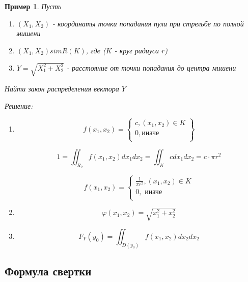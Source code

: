 \documentclass[a4paper, 14pt]{report}
\newtheorem{example}{Пример}[section]
\begin{document}
\begin{example}
    Пусть

    \begin{enumerate}
        \item $(X_1, X_2)$ - координаты точки попадания пули при стрельбе по полной мишени 
        \item $(X_1,X_2) sim R(K)$, где ($K$ - круг радиуса $r$)
        \item $Y=\sqrt{X_1^2 + X_2^2}$ - расстояние от точки попадания до центра мишени
    \end{enumerate}

    Найти закон распределения вектора $Y$

    Решение:

    \begin{enumerate}
        \item

            $$
            f(x_1, x_2) =
            \left\{
                \begin{matrix}
                    c, (x_1, x_2) \in K \\
                    0, \text{иначе} \\
                \end{matrix}
            \right\}
            $$

            $$
            1 = \iint_{R_2} f(x_1,x_2)dx_1dx_2 = \iint_K cdx_1dx_2 = c \cdot \pi r^2
            $$

            $$
            f(x_1,x_2) =
            \begin{cases}
                \frac{1}{\pi r^2}, (x_1,x_2) \in K \\
                0, \text{ иначе} \\
            \end{cases}
            $$

        \item

            $$
            \varphi(x_1,x_2) = \sqrt{x_1^2 + x_2^2}
            $$

        \item

            $$
            F_Y(y_0) = \iint_{D(y_0)} f(x_1,x_2) dx_2dx_2
            $$
    \end{enumerate}
\end{example}

\subsection{Формула свертки}
\end{document}

